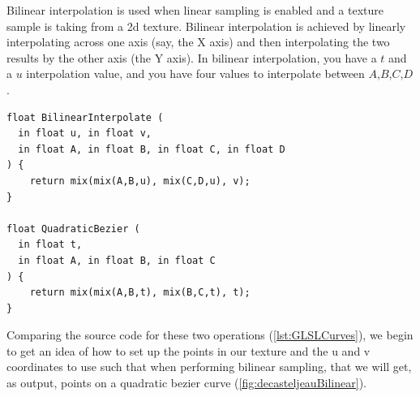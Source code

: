 \documentclass{jcgt}
\begin{document}
Bilinear interpolation is used when linear sampling is enabled and a texture sample is taking from a 2d texture.  Bilinear interpolation is achieved by linearly interpolating across one axis (say, the X axis) and then interpolating the two results by the other axis (the Y axis).  In bilinear interpolation, you have a $t$ and a $u$ interpolation value, and you have four values to interpolate between $A$,$B$,$C$,$D$.

\begin{lstlisting}[caption={GLSL implementation of bilinear interpolation and the De Casteljeau algorithm for a quadratic Bezier curve.}, label={lst:GLSLCurves}]
float BilinearInterpolate (
  in float u, in float v,
  in float A, in float B, in float C, in float D
) {
    return mix(mix(A,B,u), mix(C,D,u), v);
}

float QuadraticBezier (
  in float t,
  in float A, in float B, in float C
) {
    return mix(mix(A,B,t), mix(B,C,t), t);
}
\end{lstlisting}

Comparing the source code for these two operations  (\autoref{lst:GLSLCurves}), we begin to get an idea of how to set up the points in our texture and the u and v coordinates to use such that when performing bilinear sampling, that we will get, as output, points on a quadratic bezier curve (\autoref{fig:decasteljeauBilinear}).
\end{document}
